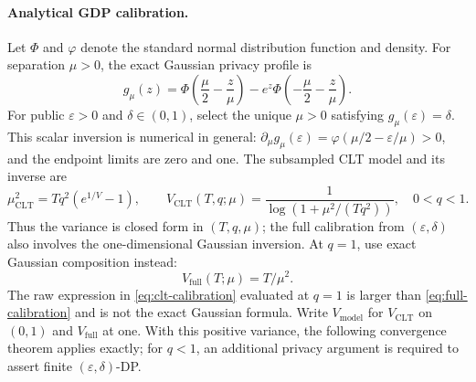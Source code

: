 \documentclass[11pt]{article}
\begin{document}
\paragraph{Analytical GDP calibration.}
Let $\Phi$ and $\varphi$ denote the standard normal distribution function and
density. For separation $\mu>0$, the exact Gaussian privacy profile is
\begin{equation}\label{eq:gaussian-profile}
 g_\mu(z)=\Phi\left(\frac\mu2-\frac z\mu\right)
       -e^z\Phi\left(-\frac\mu2-\frac z\mu\right).
\end{equation}
For public $\varepsilon>0$ and $\delta\in(0,1)$, select the unique
$\mu>0$ satisfying $g_\mu(\varepsilon)=\delta$. This scalar inversion is
numerical in general: $\partial_\mu g_\mu(\varepsilon)
=\varphi(\mu/2-\varepsilon/\mu)>0$, and the endpoint limits are zero and one.
The subsampled CLT model and its inverse are
\begin{equation}\label{eq:clt-calibration}
 \mu_{\mathrm{CLT}}^2=Tq^2(e^{1/V}-1),\qquad
 V_{\mathrm{CLT}}(T,q;\mu)
 =\frac{1}{\log(1+\mu^2/(Tq^2))},\quad 0<q<1.
\end{equation}
Thus the variance is closed form in $(T,q,\mu)$; the full calibration from
$(\varepsilon,\delta)$ also involves the one-dimensional Gaussian inversion.
At $q=1$, use exact Gaussian composition instead:
\begin{equation}\label{eq:full-calibration}
 V_{\mathrm{full}}(T;\mu)=T/\mu^2.
\end{equation}
The raw expression in \eqref{eq:clt-calibration} evaluated at $q=1$ is
larger than \eqref{eq:full-calibration} and is not the exact Gaussian formula.
Write $V_{\mathrm{model}}$ for $V_{\mathrm{CLT}}$ on $(0,1)$ and
$V_{\mathrm{full}}$ at one. With this positive variance, the following
convergence theorem applies exactly; for $q<1$, an additional privacy
argument is required to assert finite $(\varepsilon,\delta)$-DP.
\end{document}
